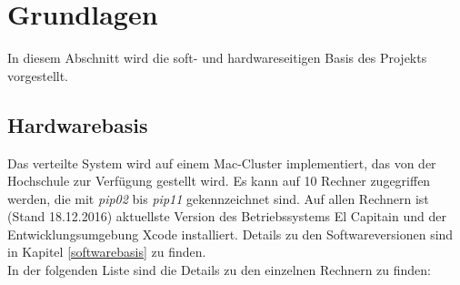 \section{Grundlagen}
\label{Voraussetzungen}
In diesem Abschnitt wird die soft- und hardwareseitigen Basis des Projekts vorgestellt. 
\subsection{Hardwarebasis}
Das verteilte System wird auf einem Mac-Cluster implementiert, das von der Hochschule zur Verfügung gestellt wird. Es kann auf 10 Rechner zugegriffen werden, die mit \emph{pip02} bis \emph{pip11} gekennzeichnet sind. Auf allen Rechnern ist (Stand 18.12.2016) aktuellste Version des Betriebssystems El Capitain und der Entwicklungsumgebung Xcode installiert. Details zu den Softwareversionen sind in Kapitel \ref{softwarebasis} zu finden. \\
In der folgenden Liste sind die Details zu den einzelnen Rechnern zu finden:

